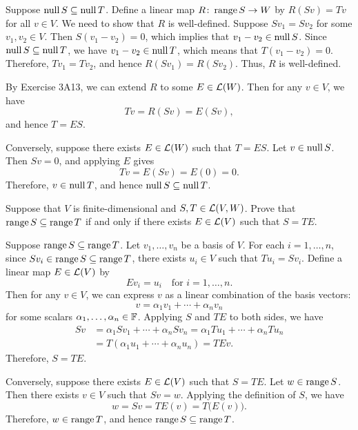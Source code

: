 \begin{exc}
\begin{solution}
Suppose $\operatorname{null} S\subseteq\operatorname{null} T$. Define a linear map $R\colon\operatorname{range} S\to W$ by
$R(Sv)=Tv$ for all $v\in V$. We need to show that $R$ is well-defined. Suppose
$Sv_1=Sv_2$ for some $v_1,v_2\in V$. Then $S(v_1-v_2)=0$, which implies that
$v_1-v_2\in\operatorname{null} S$. Since $\operatorname{null} S\subseteq\operatorname{null} T$, we have
$v_1-v_2\in\operatorname{null} T$, which means that $T(v_1-v_2)=0$. Therefore, $Tv_1=Tv_2$,
and hence $R(Sv_1)=R(Sv_2)$. Thus, $R$ is well-defined.

By Exercise 3A13, we can extend $R$ to some $E\in\mathcal{L}(W)$. Then for any
$v\in V$, we have
\[ Tv=R(Sv)=E(Sv), \]
and hence $T=ES$.

Conversely, suppose there exists $E\in\mathcal{L}(W)$ such that $T=ES$. Let
$v\in\operatorname{null} S$. Then $Sv=0$, and applying $E$ gives
\[ Tv=E(Sv)=E(0)=0. \]
Therefore, $v\in\operatorname{null} T$, and hence $\operatorname{null} S\subseteq\operatorname{null} T$.
\end{solution}

\begin{exercise}
Suppose that $V$ is finite-dimensional and $S,T\in\mathcal{L}(V,W)$. Prove that
$\operatorname{range} S\subseteq\operatorname{range} T$ if and only if there exists $E\in\mathcal{L}(V)$ such
that $S=TE$.
\end{exercise}
\begin{solution}

Suppose $\operatorname{range} S\subseteq\operatorname{range} T$. Let $v_1,\dots,v_n$ be a basis of $V$. For
each $i=1,\dots,n$, since $Sv_i\in\operatorname{range} S\subseteq\operatorname{range} T$, there exists
$u_i\in V$ such that $Tu_i=Sv_i$. Define a linear map $E\in\mathcal{L}(V)$ by
\[ Ev_i=u_i \quad\text{for } i=1,\dots,n. \]
Then for any $v\in V$, we can express $v$ as a linear combination of the basis
vectors:
\[ v=\alpha_1v_1+\cdots+\alpha_nv_n \]
for some scalars $\alpha_1,\dots,\alpha_n\in\mathbb{F}$. Applying $S$ and $TE$ to both
sides, we have
\begin{align*}
Sv &= \alpha_1Sv_1+\cdots+\alpha_nSv_n=\alpha_1Tu_1+\cdots+\alpha_nTu_n\\
   &= T(\alpha_1u_1+\cdots+\alpha_nu_n)=TEv.
\end{align*}
Therefore, $S=TE$.

Conversely, suppose there exists $E\in\mathcal{L}(V)$ such that $S=TE$. Let
$w\in\operatorname{range} S$. Then there exists $v\in V$ such that $Sv=w$. Applying the
definition of $S$, we have
\[ w=Sv=TE(v)=T\bigl(E(v)\bigr). \]
Therefore, $w\in\operatorname{range} T$, and hence $\operatorname{range} S\subseteq\operatorname{range} T$.
\end{solution}


\end{exc}
